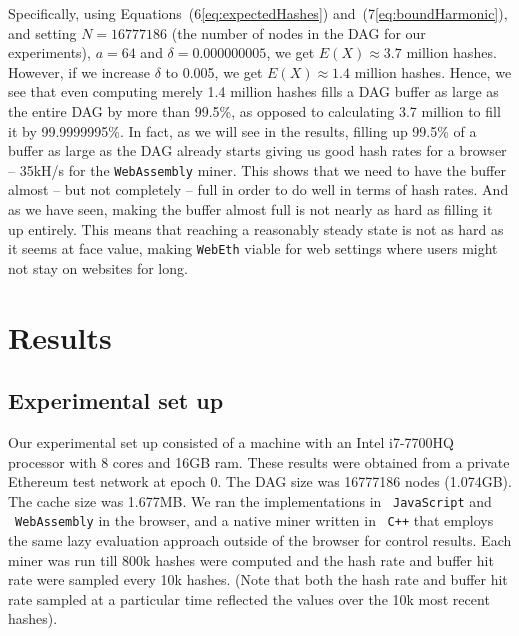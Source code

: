 \documentclass[runningheads]{llncs}
\begin{document}
Specifically, using Equations~(6\ref{eq:expectedHashes}) and~(7\ref{eq:boundHarmonic}), and setting $N = 16777186$ (the number of nodes in the DAG for our experiments), $a = 64$ and $\delta = 0.000000005$, we get $E(X) \approx 3.7$ million hashes. However, if we increase $\delta$ to 0.005, we get $E(X) \approx 1.4$ million hashes. Hence, we see that even computing merely 1.4 million hashes fills a DAG buffer as large as the entire DAG by more than 99.5\%, as opposed to calculating 3.7 million to fill it by 99.9999995\%. 
In fact, as we will see in the results, filling up 99.5\% of a buffer as large as the DAG already starts giving us good hash rates for a browser -- 35kH/s for the \verb|WebAssembly| miner. This shows that we need to have the buffer almost -- but not completely -- full in order to do well in terms of hash rates. And as we have seen, making the buffer almost full is not nearly as hard as filling it up entirely. 
This means that reaching a reasonably steady state is not as hard as it seems at face value, making \verb|WebEth| viable for web settings where users might not stay on websites for long. 

\section{Results}
\label{sec:results}
\subsection{Experimental set up}
Our experimental set up consisted of a machine with an Intel i7-7700HQ processor with 8 cores and 16GB ram. These results were obtained from a private Ethereum test network at epoch 0. The DAG size was 16777186 nodes (1.074GB). The cache size was 1.677MB. We ran the implementations in ~\verb|JavaScript| and ~\verb|WebAssembly| in the browser, and a native miner written in ~\verb|C++| that employs the same lazy evaluation approach outside of the browser for control results. Each miner was run till 800k hashes were computed and the hash rate and buffer hit rate were sampled every 10k hashes. (Note that both the hash rate and buffer hit rate sampled at a particular time reflected the values over the 10k most recent hashes).
\end{document}
